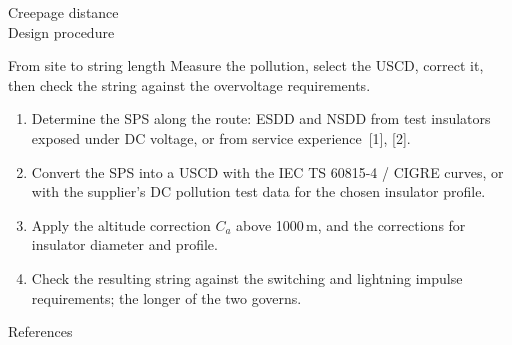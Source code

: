 \begin{frame}{Creepage distance\\Design procedure}
  \begin{block}{From site to string length}
    Measure the pollution, select the USCD, correct it, then check the
    string against the overvoltage requirements.
  \end{block}
  {\small
  \begin{enumerate}
    \setlength{\itemsep}{0.4em}
    \item Determine the SPS along the route: ESDD and NSDD from test
          insulators exposed under DC voltage, or from service experience~[1], [2].
    \item Convert the SPS into a USCD with the IEC TS 60815-4 / CIGRE curves,
          or with the supplier's DC pollution test data for the chosen
          insulator profile.
    \item Apply the altitude correction $C_{a}$ above 1000\,m, and the
          corrections for insulator diameter and profile.
    \item Check the resulting string against the switching and lightning
          impulse requirements; the longer of the two governs.
  \end{enumerate}}
\end{frame}

\begin{frame}{References}
\end{frame}
